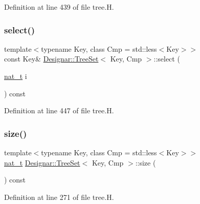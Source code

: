 Definition at line 439 of file tree.\+H.

\mbox{\label{class_designar_1_1_tree_set_a811d76a361633a8de4a37042fec3b971}} 
\subsubsection{\texorpdfstring{select()}{select()}\hspace{0.1cm}{\footnotesize\ttfamily [2/2]}}
{\footnotesize\ttfamily template$<$typename Key, class Cmp = std\+::less$<$\+Key$>$$>$ \\
const Key\& \hyperlink{class_designar_1_1_tree_set}{Designar\+::\+Tree\+Set}$<$ Key, Cmp $>$\+::select (\begin{DoxyParamCaption}\item[{\hyperlink{namespace_designar_aa72662848b9f4815e7bf31a7cf3e33d1}{nat\+\_\+t}}]{i }\end{DoxyParamCaption}) const\hspace{0.3cm}{\ttfamily [inline]}}



Definition at line 447 of file tree.\+H.

\mbox{\label{class_designar_1_1_tree_set_acb3cd6e2382851772714603d5fe5c644}} 
\subsubsection{\texorpdfstring{size()}{size()}}
{\footnotesize\ttfamily template$<$typename Key, class Cmp = std\+::less$<$\+Key$>$$>$ \\
\hyperlink{namespace_designar_aa72662848b9f4815e7bf31a7cf3e33d1}{nat\+\_\+t} \hyperlink{class_designar_1_1_tree_set}{Designar\+::\+Tree\+Set}$<$ Key, Cmp $>$\+::size (\begin{DoxyParamCaption}{ }\end{DoxyParamCaption}) const\hspace{0.3cm}{\ttfamily [inline]}}



Definition at line 271 of file tree.\+H.

\mbox{\label{class_designar_1_1_tree_set_a36f9e4e6f76d9767327ba73115841f89}} 

